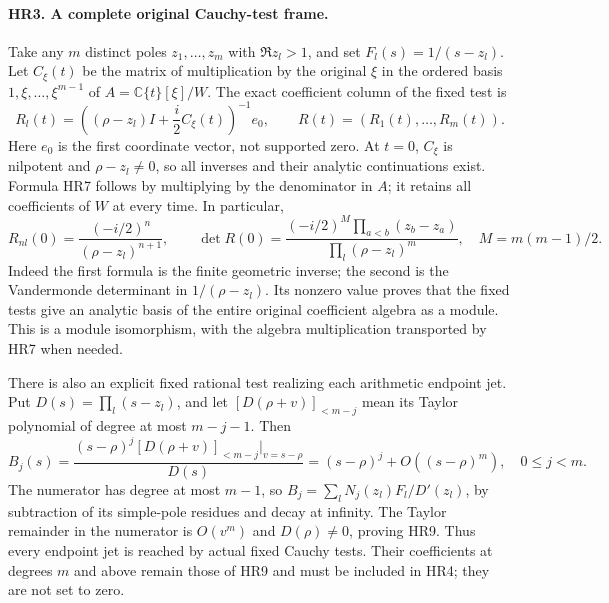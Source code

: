 \documentclass[11pt,a4paper]{article}
\theoremstyle{definition}\newtheorem{definition}[theorem]{Definition}
\begin{document}
\paragraph{HR3. A complete original Cauchy-test frame.}
Take any $m$ distinct poles $z_1,\ldots,z_m$ with $\Re z_l>1$,
and set $F_l(s)=1/(s-z_l)$. Let $C_\xi(t)$ be the matrix of
multiplication by the original $\xi$ in the ordered basis
$1,\xi,\ldots,\xi^{m-1}$ of $A=\mathbb C\{t\}[\xi]/W$.
The exact coefficient column of the fixed test is
\[
 R_l(t)=\left((\rho-z_l)I+\frac i2 C_\xi(t)\right)^{-1}e_0,
 \qquad R(t)=(R_1(t),\ldots,R_m(t)).
 \tag{HR7}
\]
Here $e_0$ is the first coordinate vector, not supported zero.
At $t=0$, $C_\xi$ is nilpotent and $\rho-z_l\ne0$, so all
inverses and their analytic continuations exist. Formula HR7
follows by multiplying by the denominator in $A$; it retains all
coefficients of $W$ at every time. In particular,
\[
 R_{nl}(0)=\frac{(-i/2)^n}{(\rho-z_l)^{n+1}},\qquad
 \det R(0)=\frac{(-i/2)^M\prod_{a<b}(z_b-z_a)}
                       {\prod_l(\rho-z_l)^m},\quad
 M=m(m-1)/2.
 \tag{HR8}
\]
Indeed the first formula is the finite geometric inverse; the
second is the Vandermonde determinant in $1/(\rho-z_l)$.
Its nonzero value proves that the fixed tests give an analytic
basis of the entire original coefficient algebra as a module.
This is a module isomorphism, with the algebra multiplication
transported by HR7 when needed.

There is also an explicit fixed rational test realizing each
arithmetic endpoint jet. Put $D(s)=\prod_l(s-z_l)$, and let
$[D(\rho+v)]_{<m-j}$ mean its Taylor polynomial of degree at most
$m-j-1$. Then
\[
 B_j(s)=\frac{(s-\rho)^j[D(\rho+v)]_{<m-j}|_{v=s-\rho}}{D(s)}
       =(s-\rho)^j+O((s-\rho)^m),\quad 0\le j<m.
 \tag{HR9}
\]
The numerator has degree at most $m-1$, so
$B_j=\sum_l N_j(z_l)F_l/D'(z_l)$, by subtraction of its
simple-pole residues and decay at infinity. The Taylor remainder
in the numerator is $O(v^m)$ and $D(\rho)\ne0$, proving HR9.
Thus every endpoint jet is reached by actual fixed Cauchy tests.
Their coefficients at degrees $m$ and above remain those of HR9
and must be included in HR4; they are not set to zero.
\end{document}
